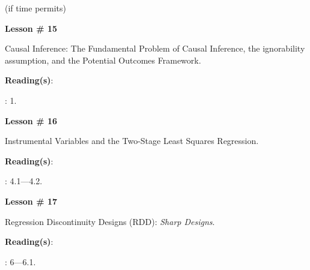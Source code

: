 \documentclass[letterpaper]{article}
\renewenvironment{itemize}{
  \begin{list}{}{
    \setlength{\leftmargin}{1.5em}
  }
}{
  \end{list}
}
\begin{document}
\begin{enumerate}
  \item {} (if time permits)


      \begin{itemize} 
        \item[$\bullet$] {\bf Lesson \# 15} %
          \begin{itemize} 
            \item[$\circ$] Causal Inference: The Fundamental Problem of Causal Inference, the ignorability assumption, and the Potential Outcomes Framework.
            \item[$\circ$] {\bf Reading(s)}: 
              \begin{itemize}
                \item[$\diamond$] \textcite{Imbens2015}: 1.
              \end{itemize}
          \end{itemize}
      \end{itemize}





      \begin{itemize} 
        \item[$\bullet$] {\bf Lesson \# 16} %
          \begin{itemize} 
            \item[$\circ$] Instrumental Variables and the Two-Stage Least Squares Regression.
            \item[$\circ$] {\bf Reading(s)}: 
              \begin{itemize}
                \item[$\diamond$] \textcite{Angrist2009}: 4.1---4.2.
              \end{itemize}
          \end{itemize}
      \end{itemize}




      \begin{itemize} 
        \item[$\bullet$] {\bf Lesson \# 17} %
          \begin{itemize} 
            \item[$\circ$] Regression Discontinuity Designs (RDD): \emph{Sharp Designs}.
            \item[$\circ$] {\bf Reading(s)}: 
              \begin{itemize}
                \item[$\diamond$] \textcite{Angrist2009}: 6---6.1.
              \end{itemize}
          \end{itemize}
      \end{itemize}



\end{enumerate}
\end{document}
